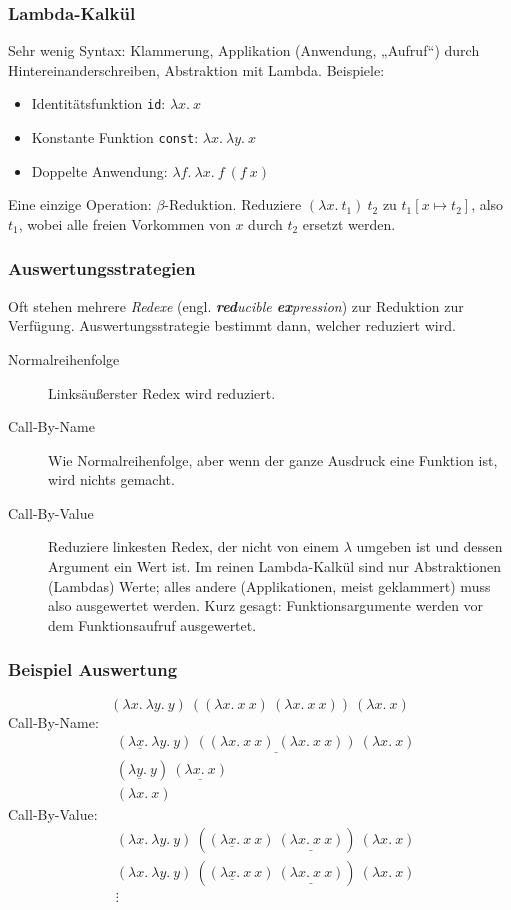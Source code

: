 \documentclass{beamer}
\begin{document}
\begin{frame}
  \frametitle{Lambda-Kalkül}
  Sehr wenig Syntax: Klammerung, Applikation (Anwendung, „Aufruf“) durch Hintereinanderschreiben, Abstraktion mit Lambda.
  Beispiele:
  \begin{itemize}
  \item Identitätsfunktion \lstinline{id}: $λx.~x$
  \item Konstante Funktion \lstinline{const}: $λx.~λy.~x$
  \item Doppelte Anwendung: $λf.~λx.~f~(f~x)$
  \end{itemize}
  Eine einzige Operation: $β$-Reduktion.
  Reduziere $(λx.~t_1)~t_2$ zu $t_1[x \mapsto t_2]$,
  also $t_1$, wobei alle freien Vorkommen von $x$ durch $t_2$ ersetzt werden.
\end{frame}

\begin{frame}
  \frametitle{Auswertungsstrategien}
  Oft stehen mehrere \emph{Redexe} (engl. \emph{\textbf{red}ucible \textbf{ex}pression}) zur Reduktion zur Verfügung.
  Auswertungsstrategie bestimmt dann, welcher reduziert wird.
  \begin{description}
  \item[Normalreihenfolge]
    Linksäußerster Redex wird reduziert.
  \item[Call-By-Name]
    Wie Normalreihenfolge, aber wenn der ganze Ausdruck eine Funktion ist, wird nichts gemacht.
  \item[Call-By-Value]
    Reduziere linkesten Redex, der nicht von einem $λ$ umgeben ist und dessen Argument ein Wert ist.
    Im reinen Lambda-Kalkül sind nur Abstraktionen (Lambdas) Werte;
    alles andere (Applikationen, meist geklammert) muss also ausgewertet werden.
    Kurz gesagt: Funktionsargumente werden vor dem Funktionsaufruf ausgewertet.
  \end{description}
\end{frame}

\begin{frame}
  \frametitle{Beispiel Auswertung}
  \[(λx.~λy.~y)~((λx.~x~x)~(λx.~x~x))~(λx.~x)\]
  \pause
  Call-By-Name:
  \begin{align*}
    & (λ\underline{x}.~λy.~y)~\underline{((λx.~x~x)~(λx.~x~x))}~(λx.~x) \\
    & (λ\underline{y}.~y)~\underline{(λx.~x)} \\
    & (λx.~x)
  \end{align*}
  \pause
  Call-By-Value:
  \begin{align*}
    & (λx.~λy.~y)~((λ\underline{x}.~x~x)~\underline{(λx.~x~x)})~(λx.~x) \\
    & (λx.~λy.~y)~((λ\underline{x}.~x~x)~\underline{(λx.~x~x)})~(λx.~x) \\
    & \vdots
  \end{align*}
\end{frame}
\end{document}
